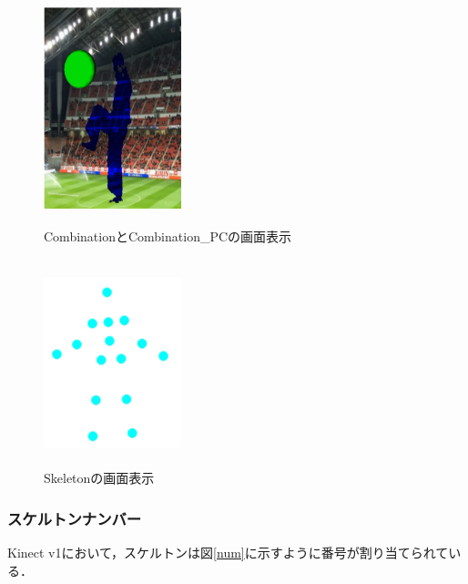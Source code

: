 \begin{figure}[p]
    \begin{minipage}{0.5\hsize}
     \begin{center}
      \includegraphics[width=4cm,height=6cm]{image/Combination.png}
     \end{center}
     \caption{CombinationとCombination\_PCの画面表示}
     \label{combination}
    \end{minipage}
    \begin{minipage}{0.5\hsize}
     \begin{center}
      \includegraphics[width=4cm,height=6cm]{image/Skeleton.png}
     \end{center}
     \caption{Skeletonの画面表示}
     \label{skeleton}
    \end{minipage}
\end{figure}

\clearpage

\subsubsection{スケルトンナンバー}
Kinect v1において，スケルトンは図\ref{num}に示すように番号が割り当てられている．

